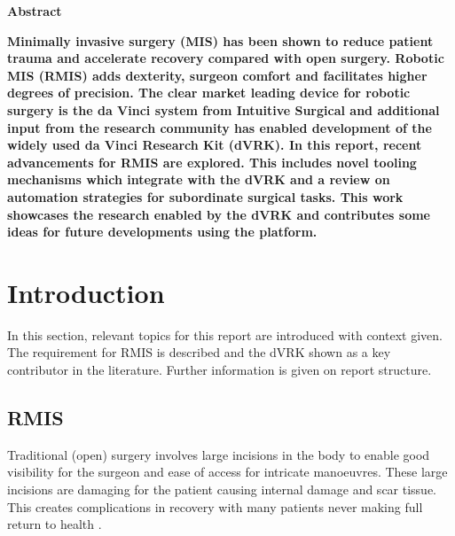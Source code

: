 \documentclass[english]{sobraep}
\begin{document}
\setcounter{page}{1}
\thispagestyle{plain}
\begin{center}
    
    \textbf{Abstract}
\end{center}
\textbf{Minimally invasive surgery (MIS) has been shown to reduce patient trauma and accelerate recovery compared with open surgery. Robotic MIS (RMIS) adds dexterity, surgeon comfort and facilitates higher degrees of precision. The clear market leading device for robotic surgery is the da Vinci system from Intuitive Surgical and additional input from the research community has enabled development of the widely used da Vinci Research Kit (dVRK). In this report, recent advancements for RMIS are explored. This includes novel tooling mechanisms which integrate with the dVRK and a review on automation strategies for subordinate surgical tasks. This work showcases the research enabled by the dVRK and contributes some ideas for future developments using the platform.}

\section{Introduction}
\par{In this section, relevant topics for this report are introduced with context given. The requirement for RMIS is described and the dVRK shown as a key contributor in the literature. Further information is given on report structure. }


\subsection{RMIS}
\par{Traditional (open) surgery involves large incisions in the body to enable good visibility for the surgeon and ease of access for intricate manoeuvres. These large incisions are damaging for the patient causing internal damage and scar tissue. This creates complications in recovery with many patients never making full return to health \cite{Nezhat2021}.}
\end{document}

